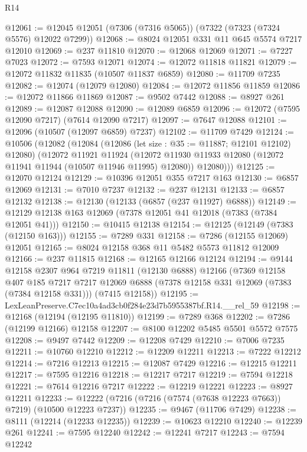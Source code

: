 \begin{lexlean}{R14}
\begin{coremodule}
@12061 := @12045 @12051 (@7306 (@7316 @5065)) (@7322 (@7323 (@7324 @5576) @12022 @7299))
@12068 := @8024 @12051 @331 @11 @645 @5574 @7217 @12010
@12069 := @237 @11810
@12070 := @12068 @12069
@12071 := @7227 @7023
@12072 := @7593 @12071
@12074 := @12072 @11818 @11821
@12079 := @12072 @11832 @11835 (@10507 @11837 @6859)
@12080 := @11709 @7235
@12082 := @12074 (@12079 @12080)
@12084 := @12072 @11856 @11859
@12086 := @12072 @11866 @11869
@12087 := @9502 @7442
@12088 := @8927 @261
@12089 := @12087 @12088
@12090 := @12089 @6859
@12096 := @12072 (@7595 @12090 @7217) (@7614 @12090 @7217)
@12097 := @7647 @12088
@12101 := @12096 (@10507 (@12097 @6859) @7237)
@12102 := @11709 @7429
@12124 := @10506
    (@12082
      (@12084
        (@12086 (let size : @35 := @11887; @12101 @12102) @12080)
        (@12072
          @11921
          @11924
          (@12072 @11930 @11933 @12080 (@12072 @11941 @11944 (@10507 @11946 @11995) @12080))
          @12080)))
@12125 := @12070 @12124
@12129 := @10396 @12051 @355 @7217 @163
@12130 := @6857 @12069
@12131 := @7010 @7237
@12132 := @237 @12131
@12133 := @6857 @12132
@12138 := @12130 (@12133 (@6857 (@237 @11927) @6888))
@12149 := @12129 @12138 @163 @12069 (@7378 @12051 @41 @12018 (@7383 (@7384 @12051 @41)))
@12150 := @10415 @12138
@12154 := @12125 (@12149 (@7383 (@12150 @163)))
@12155 := @7289 @331
@12158 := @7286 (@12155 @12069) @12051
@12165 := @8024 @12158 @368 @11 @5482 @5573 @11812 @12009
@12166 := @237 @11815
@12168 := @12165 @12166 @12124
@12194 := @9144
    @12158
    @2307
    @964
    @7219
    @11811
    (@12130 @6888)
    @12166
    (@7369
      @12158
      @407
      @185
      @7217
      @7217
      @12069
      @6888
      (@7378 @12158 @331 @12069 (@7383 (@7384 @12158 @331)))
      (@7415 @12158))
@12195 := LexLeanPreserve.C7ec10a4ad3cb0f284e23d7b5955387bf.R14.__rel_59
@12198 := @12168 (@12194 (@12195 @11810))
@12199 := @7289 @368
@12202 := @7286 (@12199 @12166) @12158
@12207 := @8100 @12202 @5485 @5501 @5572 @7575
@12208 := @9497 @7442
@12209 := @12208 @7429
@12210 := @7006 @7235
@12211 := @10760 @12210
@12212 := @12209 @12211
@12213 := @7222 @12212
@12214 := @7216 @12213
@12215 := @12087 @7429
@12216 := @12215 @12211
@12217 := @7595 @12216
@12218 := @12217 @7217
@12219 := @7594 @12218
@12221 := @7614 @12216 @7217
@12222 := @12219 @12221
@12223 := @8927 @12211
@12233 := @12222 (@7216 (@7216 (@7574 (@7638 @12223 @7663)) @7219) (@10500 @12223 @7237))
@12235 := @9467 (@11706 @7429)
@12238 := @8111 (@12214 (@12233 @12235))
@12239 := @10623 @12210
@12240 := @12239 @261
@12241 := @7595 @12240
@12242 := @12241 @7217
@12243 := @7594 @12242

\end{coremodule}
\end{lexlean}

